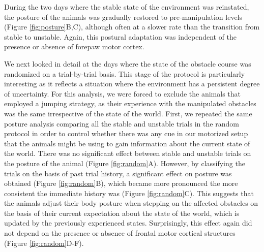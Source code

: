 During the two days where the stable state of the environment was reinstated, the posture of the animals was gradually restored to pre-manipulation levels (Figure \ref{fig:posture}B,C), although often at a slower rate than the transition from stable to unstable. Again, this postural adaptation was independent of the presence or absence of forepaw motor cortex.

We next looked in detail at the days where the state of the obstacle course was randomized on a trial-by-trial basis. This stage of the protocol is particularly interesting as it reflects a situation where the environment has a persistent degree of uncertainty. For this analysis, we were forced to exclude the animals that employed a jumping strategy, as their experience with the manipulated obstacles was the same irrespective of the state of the world. First, we repeated the same posture analysis comparing all the stable and unstable trials in the random protocol in order to control whether there was any cue in our motorized setup that the animals might be using to gain information about the current state of the world. There was no significant effect between stable and unstable trials on the posture of the animal (Figure \ref{fig:random}A). However, by classifying the trials on the basis of past trial history, a significant effect on posture was obtained (Figure \ref{fig:random}B), which became more pronounced the more consistent the immediate history was (Figure \ref{fig:random}C). This suggests that the animals adjust their body posture when stepping on the affected obstacles on the basis of their current expectation about the state of the world, which is updated by the previously experienced states. Surprisingly, this effect again did not depend on the presence or absence of frontal motor cortical structures (Figure \ref{fig:random}D-F).

